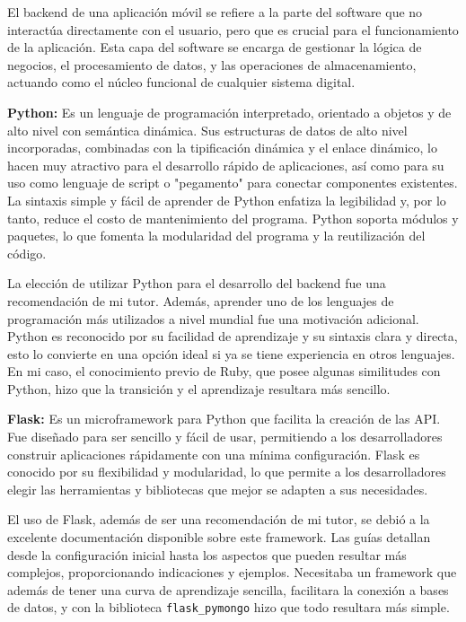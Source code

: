 El backend de una aplicación móvil se refiere a la parte del software que no interactúa directamente con el usuario, pero que es crucial para el funcionamiento de la aplicación. Esta capa del software se encarga de gestionar la lógica de negocios, el procesamiento de datos, y las operaciones de almacenamiento, actuando como el núcleo funcional de cualquier sistema digital.

\textbf{Python:} Es un lenguaje de programación interpretado, orientado a objetos y de alto nivel con semántica dinámica. Sus estructuras de datos de alto nivel incorporadas, combinadas con la tipificación dinámica y el enlace dinámico, lo hacen muy atractivo para el desarrollo rápido de aplicaciones, así como para su uso como lenguaje de script o "pegamento" para conectar componentes existentes. La sintaxis simple y fácil de aprender de Python enfatiza la legibilidad y, por lo tanto, reduce el costo de mantenimiento del programa. Python soporta módulos y paquetes, lo que fomenta la modularidad del programa y la reutilización del código. \cite{python_faq}

La elección de utilizar Python para el desarrollo del backend fue una recomendación de mi tutor. Además, aprender uno de los lenguajes de programación más utilizados a nivel mundial fue una motivación adicional. Python es reconocido por su facilidad de aprendizaje y su sintaxis clara y directa, esto lo convierte en una opción ideal si ya se tiene experiencia en otros lenguajes. En mi caso, el conocimiento previo de Ruby, que posee algunas similitudes con Python, hizo que la transición  y el aprendizaje resultara más sencillo.

\textbf{Flask:} Es un microframework para Python que facilita la creación de las API. Fue diseñado para ser sencillo y fácil de usar, permitiendo a los desarrolladores construir aplicaciones rápidamente con una mínima configuración. Flask es conocido por su flexibilidad y modularidad, lo que permite a los desarrolladores elegir las herramientas y bibliotecas que mejor se adapten a sus necesidades. \cite{python_basics}

El uso de Flask, además de ser una recomendación de mi tutor, se debió a la excelente documentación disponible sobre este framework. Las guías detallan desde la configuración inicial hasta los aspectos que pueden resultar más complejos, proporcionando indicaciones y ejemplos. Necesitaba un framework que además de tener una curva de aprendizaje sencilla, facilitara la conexión a bases de datos, y con la biblioteca \texttt{flask\_pymongo} hizo que todo resultara más simple.


